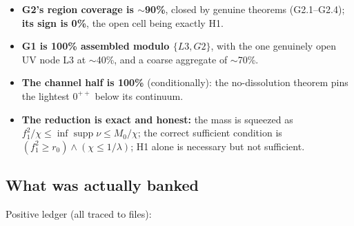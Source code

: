 \begin{itemize}
\item \textbf{G2's region coverage is $\sim$90\%}, closed by genuine theorems (G2.1--G2.4);
  \textbf{its sign is 0\%}, the open cell being exactly H1.
\item \textbf{G1 is 100\% assembled modulo $\{L3,G2\}$}, with the one genuinely open UV node L3 at
  $\sim$40\%, and a coarse aggregate of $\sim$70\%.
\item \textbf{The channel half is 100\%} (conditionally): the no-dissolution theorem pins the
  lightest $0^{++}$ below its continuum.
\item \textbf{The reduction is exact and honest:} the mass is squeezed as
  $f_1^2/\chi\le\inf\operatorname{supp}\nu\le M_0/\chi$; the correct sufficient condition is
  $(f_1^2\ge r_0)\wedge(\chi\le1/\lambda)$; H1 alone is necessary but not sufficient.
\end{itemize}

\subsection{What was actually banked}

Positive ledger (all traced to files):


